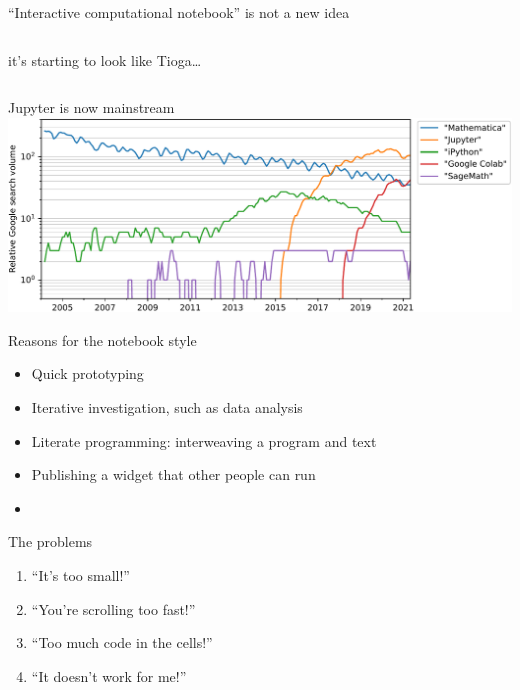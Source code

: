 \documentclass[aspectratio=169]{beamer}
\begin{document}
\begin{frame}{``Interactive computational notebook'' is not a new idea}
\begin{columns}
{it's starting to look like Tioga\ldots}
\end{columns}
\end{frame}

\begin{frame}{Jupyter is now mainstream}
\vspace{0.5 cm}
\includegraphics[width=\linewidth]{img/trends-jupyter-ipython.pdf}
\end{frame}

\begin{frame}{Reasons for the notebook style}
\vspace{0.5 cm}
\Large
\begin{itemize}\setlength{\itemsep}{0.5 cm}
\item Quick prototyping
\item Iterative investigation, such as data analysis
\item Literate programming: interweaving a program and text
\item Publishing a widget that other people can run
\item {}
\end{itemize}

\hfill {}

\vspace{-0.2 cm}
\hfill {}
\end{frame}

\begin{frame}{The problems}
\vspace{0.5 cm}
\LARGE
\begin{center}
\begin{minipage}{0.6\linewidth}
\begin{enumerate}\setlength{\itemsep}{0.75 cm}
\item ``It's too small!''
\item ``You're scrolling too fast!''
\item ``Too much code in the cells!''
\item ``It doesn't work for me!''
\end{enumerate}
\end{minipage}
\end{center}
\end{frame}
\end{document}
